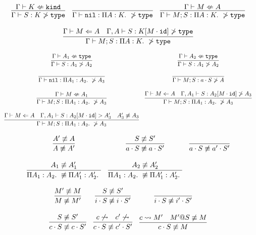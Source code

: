 \documentclass[11pt,twoside]{article}
\begin{document}
\bigskip 
{}
\bigskip 

$$
\begin{array}{ccc}
\infer{\NoFocus{S}{K}{\Type}} {\NoCheck{K}{\Kind}} &
\infer{\NoFocus{\Nil}{\PiTyp{A}{K}}{\Type}}{} &
\infer{\NoFocus{M;S}{\PiTyp{A}{K}}{\Type}}{\NoCheck{M}{A}}\\\\
\multicolumn{3}{c}{\infer{\NoFocus{M;S}{\PiTyp{A}{K}}{\Type}}{\CheckTy{M}{A} & \NoFocus[\Gamma,A]{S}{K[M\cdot\IdSub]}{\Type}}}
\end{array} 
$$

\bigskip 
{}
\bigskip 

$$
\begin{array}{cc}
\infer{\NoFocus{S}{A_1}{A_2}} {\NoCheck{A_1}{\Type}} &
\infer{\NoFocus{S}{A_1}{A_2}} {\NoCheck{A_2}{\Type}} \\\\
\infer{\NoFocus{\Nil}{\PiTyp{A_1}{A_2}}{A_3}}{} &
\infer{\NoFocus{M;S}{a\cdot S}{A}}{} \\\\
\infer{\NoFocus{M;S}{\PiTyp{A_1}{A_2}}{A_3}}{\NoCheck{M}{A_1}} &
\infer{\NoFocus{M;S}{\PiTyp{A_1}{A_2}}{A_3}}
                  {\CheckTy{M}{A} & \NoFocus[\Gamma,A_1]{S}{A_2[M\cdot\IdSub]}{A_3}} \\\\
\infer{\NoFocus{M;S}{\PiTyp{A_1}{A_2}}{A_3}}
                  {\CheckTy{M}{A} & \Focus[\Gamma,A_1]{S}{A_2[M\cdot\IdSub]}{A_3'} & \NoEquiv{A_3'}{A_3}} 
\end{array} 
$$

\bigskip 
{}
\bigskip 

$$
\begin{array}{ccc}
\infer{\NoEquiv{A}{A'}}{\NoEquiv{A'}{A}} &
\infer{\NoEquiv{a\cdot S}{a\cdot S'}}{\NoEquiv{S}{S'}} &
\infer{\NoEquiv{a\cdot S}{a'\cdot S'}}{} \\\\
\infer{\NoEquiv{\PiTyp{A_1}{A_2}}{\PiTyp{A_1'}{A_2'}}}{\NoEquiv{A_1}{A_1'}} &
\infer{\NoEquiv{\PiTyp{A_1}{A_2}}{\PiTyp{A_1'}{A_2'}}}{\NoEquiv{A_2}{A_2'}} 
\end{array} 
$$

\bigskip 
{}
\bigskip 

$$
\begin{array}{ccc}
\infer{\NoEquiv{M}{M'}}{\NoEquiv{M'}{M}} &
\infer{\NoEquiv{i\cdot S}{i\cdot S'}}{\NoEquiv{S}{S'}} &
\infer{\NoEquiv{i\cdot S}{i'\cdot S'}}{} \\\\
\infer{\NoEquiv{c\cdot S}{c\cdot S'}}{\NoEquiv{S}{S'}} &
\infer{\NoEquiv{c\cdot S}{c'\cdot S'}}{c\NoStep & c'\NoStep} &
\infer{\NoEquiv{c\cdot S}{M}}{c\StepsTo M' & \NoEquiv{M' @ S}{M}} 
\end{array} 
$$
\end{document}
